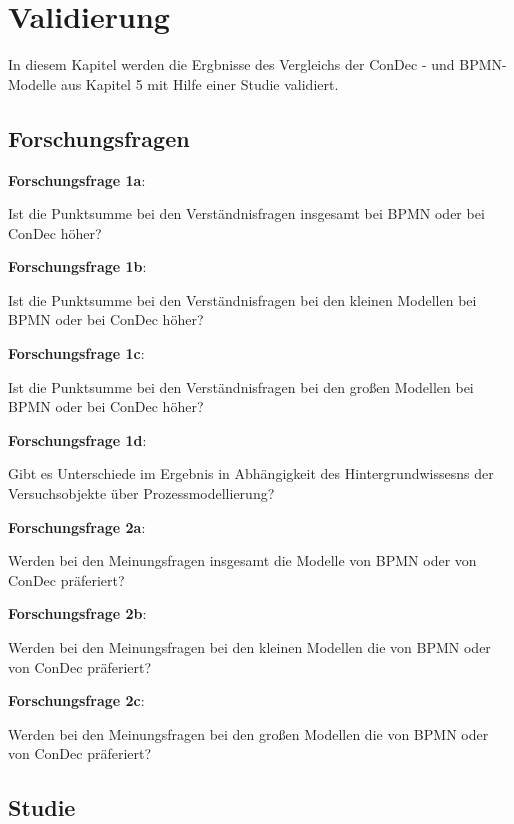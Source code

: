\chapter{Validierung}\label{sec:chapter7}

In diesem Kapitel werden die Ergbnisse des Vergleichs der ConDec - und BPMN-Modelle aus Kapitel 5 mit Hilfe einer Studie validiert.

\section{Forschungsfragen}

\textbf{Forschungsfrage 1a}: 

Ist die Punktsumme bei den Verständnisfragen insgesamt bei BPMN oder bei ConDec höher?\newline



\textbf{Forschungsfrage 1b}: 

Ist die Punktsumme bei den Verständnisfragen bei den kleinen Modellen bei BPMN oder bei ConDec höher?\newline

\textbf{Forschungsfrage 1c}: 

Ist die Punktsumme bei den Verständnisfragen bei den großen Modellen bei BPMN oder bei ConDec höher? \newline

\textbf{Forschungsfrage 1d}: 

Gibt es Unterschiede im Ergebnis in Abhängigkeit des Hintergrundwissesns der Versuchsobjekte über Prozessmodellierung?  \newline

\textbf{Forschungsfrage 2a}: 

Werden bei den Meinungsfragen insgesamt die Modelle von BPMN oder von ConDec präferiert? \newline

\textbf{Forschungsfrage 2b}: 

Werden bei den Meinungsfragen bei den kleinen Modellen die von BPMN oder von ConDec präferiert?\newline

\textbf{Forschungsfrage 2c}: 

Werden bei den Meinungsfragen bei den großen Modellen die von BPMN oder von ConDec präferiert?\newline

\section{Studie}

